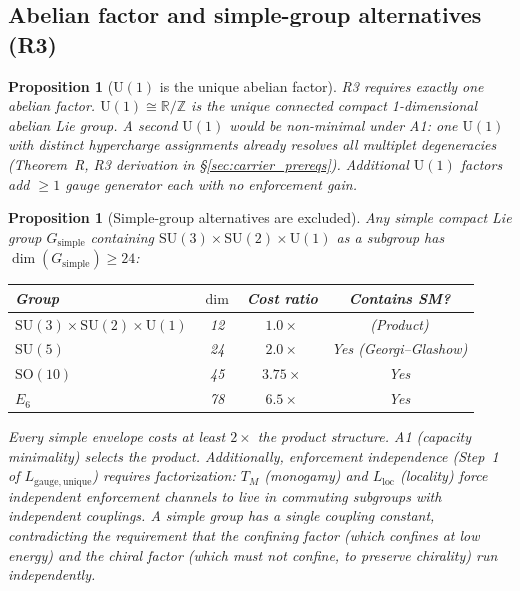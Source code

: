 \documentclass[11pt,a4paper]{article}
\newtheorem{proposition}[theorem]{Proposition}
\theoremstyle{definition}
\newcommand{\SU}{\mathrm{SU}}
\newcommand{\U}{\mathrm{U}}
\begin{document}
\subsection{Abelian factor and simple-group alternatives (R3)}
\label{sec:R3_simple}

\begin{proposition}[$\U(1)$ is the unique abelian factor]\label{prop:R3_unique}
R3 requires exactly one abelian factor.  $\U(1) \cong \mathbb{R}/\mathbb{Z}$
is the unique connected compact 1-dimensional abelian Lie group.  A
second $\U(1)$ would be non-minimal under A1: one $\U(1)$ with distinct
hypercharge assignments already resolves all multiplet degeneracies
(Theorem~R, R3 derivation in \S\ref{sec:carrier_prereqs}).  Additional
$\U(1)$ factors add $\ge 1$ gauge generator each with no enforcement gain.
\end{proposition}

\begin{proposition}[Simple-group alternatives are excluded]\label{prop:no_simple}
Any simple compact Lie group $G_{\mathrm{simple}}$ containing
$\SU(3) \times \SU(2) \times \U(1)$ as a subgroup has
$\dim(G_{\mathrm{simple}}) \ge 24$:

\smallskip
\begin{center}
\small
\begin{tabular}{@{}lccc@{}}
\toprule
\textbf{Group} & $\dim$ & \textbf{Cost ratio} & \textbf{Contains SM?} \\
\midrule
$\SU(3) \times \SU(2) \times \U(1)$ & 12 & $1.0\times$ & (Product) \\
$\SU(5)$   & 24 & $2.0\times$ & Yes (Georgi--Glashow) \\
$\mathrm{SO}(10)$ & 45 & $3.75\times$ & Yes \\
$E_6$ & 78 & $6.5\times$ & Yes \\
\bottomrule
\end{tabular}
\end{center}

\smallskip\noindent Every simple envelope costs at least $2\times$ the
product structure.  A1 (capacity minimality) selects the product.
Additionally, enforcement independence (Step~1 of
$L_{\mathrm{gauge,unique}}$) requires factorization: $T_M$ (monogamy)
and $L_{\mathrm{loc}}$ (locality) force independent enforcement
channels to live in commuting subgroups with independent couplings.
A simple group has a single coupling constant, contradicting the
requirement that the confining factor (which confines at low energy)
and the chiral factor (which must \emph{not} confine, to preserve
chirality) run independently.
\end{proposition}
\end{document}
